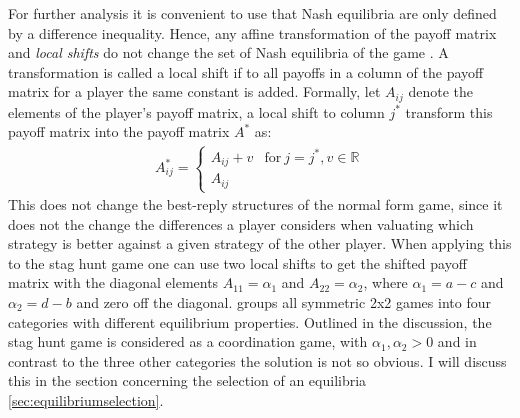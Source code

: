\documentclass[11pt]{article}
\newcommand{\realnumb}{\mathbb{R}}
\begin{document}
For further analysis it is convenient to use that Nash equilibria are only
defined by a difference inequality. Hence, any affine transformation of the
payoff matrix and \textit{local shifts} do not change the set of Nash equilibria 
of the game \parencite[17-19]{weibull_evolutionary_1997}. A transformation is
called a local shift if to all payoffs in a column of the payoff matrix for 
a player the same constant is added. Formally, let $A_{ij}$ denote the 
elements of the player's payoff matrix, a local shift to column $j^*$ 
transform this payoff
matrix into the payoff matrix $A^*$ as:
\begin{align}
        A^*_{ij} =
        \begin{cases}
                A_{ij} + v & \text{for}\ j=j^*, v \in \realnumb \\
                A_{ij}
        \end{cases}
\end{align}
This does not change the best-reply structures of the normal form game,
since it does not the change the differences a player considers when valuating
which strategy is better against a given strategy of the other player. When 
applying this to the stag hunt game one can use two local shifts to get
the shifted payoff matrix with the diagonal elements $A_{11}=\alpha_1$ and 
$A_{22}=\alpha_2$, where $\alpha_1=a-c$ and $\alpha_2=d-b$ and 
zero off the diagonal. \textcite[28]{weibull_evolutionary_1997} 
groups all symmetric 2x2 games into four categories with different 
equilibrium properties. Outlined in the discussion, the stag hunt game 
is considered as a coordination game, with $\alpha_1, \alpha_2 > 0$
and in contrast to the three other categories the solution is not so obvious.
I will discuss this in the section concerning the selection of an equilibria 
\ref{sec:equilibriumselection}.
\end{document}
